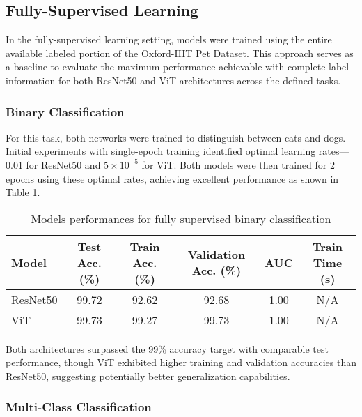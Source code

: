 \documentclass{article}
\begin{document}
\subsection{Fully-Supervised Learning}
In the fully-supervised learning setting, models were trained using the entire available labeled portion of the Oxford-IIIT Pet Dataset. This approach serves as a baseline to evaluate the maximum performance achievable with complete label information for both ResNet50 and ViT architectures across the defined tasks.

\subsubsection{Binary Classification}
For this task, both networks were trained to distinguish between cats and dogs. Initial experiments with single-epoch training identified optimal learning rates—0.01 for ResNet50 and $5 \times 10^{-5}$ for ViT. Both models were then trained for 2 epochs using these optimal rates, achieving excellent performance as shown in Table \ref{tab:fully_binary_perf}.

\renewcommand{\arraystretch}{1.2} 
\begin{table}[h!]
    \centering
    \caption{Models performances for fully supervised binary classification}
    \label{tab:fully_binary_perf}
    \begin{tabular}{|l|c|c|c|c|c|}
        \hline
        Model & Test Acc. (\%) & Train Acc. (\%) & Validation Acc. (\%) & AUC & Train Time (s) \\
        \hline
        ResNet50 & 99.72 & 92.62 & 92.68 & 1.00 & N/A \\
        ViT & 99.73 & 99.27 & 99.73 & 1.00 & N/A \\
        \hline
    \end{tabular}
\end{table}

Both architectures surpassed the 99\% accuracy target with comparable test performance, though ViT exhibited higher training and validation accuracies than ResNet50, suggesting potentially better generalization capabilities.

\subsubsection{Multi-Class Classification}
\end{document}
